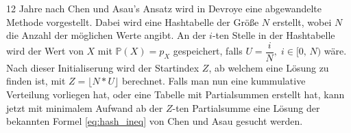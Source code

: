 12 Jahre nach Chen und Asau's Ansatz wird in Devroye 
\cite{devroye-non_uniform_random_variate-1986} eine abgewandelte Methode 
vorgestellt. Dabei wird eine Hashtabelle der Größe $N$ erstellt, wobei $N$ die 
Anzahl der möglichen Werte angibt. An der $i$-ten Stelle in der Hashtabelle wird 
der Wert von $X$ mit $\mathbb{P}(X) = p_X$ gespeichert, falls $U = \dfrac{i}{N},\; i \in 
[0,\, N)$ wäre. Nach dieser Initialiserung wird der Startindex $Z$, ab welchem 
eine Lösung zu finden ist, mit $Z = \lfloor N * U \rfloor$ berechnet. Falls man 
nun eine kummulative Verteilung vorliegen hat, oder eine Tabelle mit Partialsummen 
erstellt hat, kann jetzt mit minimalem Aufwand ab der $Z$-ten Partialsumme eine 
Lösung der bekannten Formel \eqref{eq:hash_ineq} von Chen und Asau gesucht werden.
